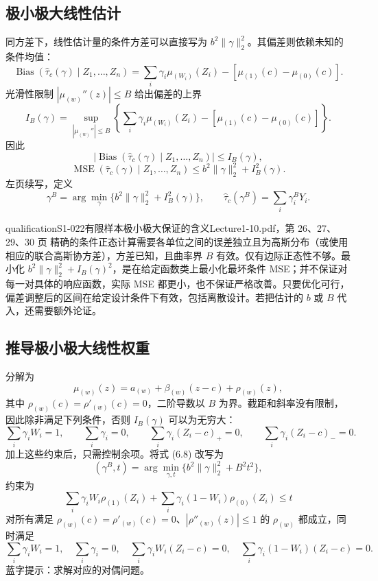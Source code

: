 \subsection{极小极大线性估计}
同方差下，线性估计量的条件方差可以直接写为 $b^2\|\gamma\|_2^2$。其偏差则依赖未知的条件均值：
\[
\operatorname{Bias}(\widehat\tau_c(\gamma)\mid Z_1,\ldots,Z_n)
=\sum_i\gamma_i\mu_{(W_i)}(Z_i)-[\mu_{(1)}(c)-\mu_{(0)}(c)].
\]
光滑性限制 $|\mu_{(w)}''(z)|\leq B$ 给出偏差的上界
\[
I_B(\gamma)=\sup_{|\mu_{(w)}''|\leq B}
\left\{\sum_i\gamma_i\mu_{(W_i)}(Z_i)-[\mu_{(1)}(c)-\mu_{(0)}(c)]\right\}.
\]
因此
\[
|\operatorname{Bias}(\widehat\tau_c(\gamma)\mid Z_1,\ldots,Z_n)|\leq I_B(\gamma),
\]
\[
\operatorname{MSE}(\widehat\tau_c(\gamma)\mid Z_1,\ldots,Z_n)
\leq b^2\|\gamma\|_2^2+I_B^2(\gamma).
\]
左页续写，定义
\[
\gamma^B=\arg\min_\gamma\{b^2\|\gamma\|_2^2+I_B^2(\gamma)\},\qquad
\widehat\tau_c(\gamma^B)=\sum_i\gamma_i^B Y_i.
\tag{原笔记 6.8}
\]
\begin{reviewnote}{qualification}{S1-022}{有限样本极小极大保证的含义}{Lecture1-10.pdf，第 26、27、29、30 页}
精确的条件正态计算需要各单位之间的误差独立且为高斯分布（或使用相应的联合高斯协方差），方差已知，且曲率界 $B$ 有效。仅有边际正态性不够。最小化 $b^2\|\gamma\|_2^2+I_B(\gamma)^2$，是在给定函数类上最小化最坏条件 MSE；并不保证对每一对具体的响应函数，实际 MSE 都更小，也不保证严格改善。只要优化可行，偏差调整后的区间在给定设计条件下有效，包括离散设计。若把估计的 $b$ 或 $B$ 代入，还需要额外论证。
\end{reviewnote}

\subsection{推导极小极大线性权重}
分解为
\[
\mu_{(w)}(z)=a_{(w)}+\beta_{(w)}(z-c)+\rho_{(w)}(z),
\]
其中 $\rho_{(w)}(c)=\rho'_{(w)}(c)=0$，二阶导数以 $B$ 为界。截距和斜率没有限制，因此除非满足下列条件，否则 $I_B(\gamma)$ 可以为无穷大：
\[
\sum_i\gamma_iW_i=1,\qquad \sum_i\gamma_i=0,\qquad
\sum_i\gamma_i(Z_i-c)_+=0,\qquad \sum_i\gamma_i(Z_i-c)_-=0.
\]
加上这些约束后，只需控制余项。将式 (6.8) 改写为
\[
(\gamma^B,t)=\arg\min_{\gamma,t}\{b^2\|\gamma\|_2^2+B^2t^2\},
\]
约束为
\[
\sum_i\gamma_iW_i\rho_{(1)}(Z_i)+\sum_i\gamma_i(1-W_i)\rho_{(0)}(Z_i)\leq t
\]
对所有满足 $\rho_{(w)}(c)=\rho'_{(w)}(c)=0$、$|\rho''_{(w)}(z)|\leq1$ 的 $\rho_{(w)}$ 都成立，同时满足
\[
\sum_i\gamma_iW_i=1,\quad\sum_i\gamma_i=0,\quad
\sum_i\gamma_iW_i(Z_i-c)=0,\quad
\sum_i\gamma_i(1-W_i)(Z_i-c)=0.
\tag{原笔记 6.10}
\]
蓝字提示：求解对应的对偶问题。

